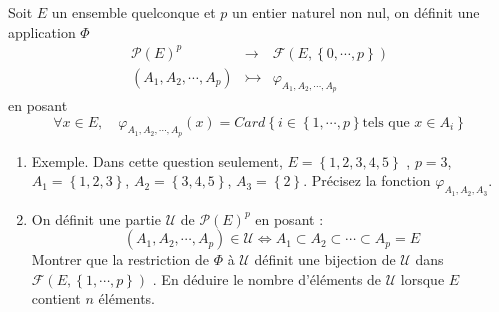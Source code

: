 Soit $E$ un ensemble quelconque et $p$ un entier naturel non nul,
on
d{\'e}finit une application $\Phi $%
\begin{eqnarray*}
\mathcal{P}(E)^{p} &\longrightarrow &\mathcal{F}(E,\left\{
0,\cdots
,p\right\} ) \\
(A_{1},A_{2},\cdots ,A_{p}) &\rightarrowtail &\varphi
_{A_{1},A_{2},\cdots ,A_{p}}
\end{eqnarray*}
en posant
\[
\forall x\in E,\quad \varphi _{A_{1},A_{2},\cdots
,A_{p}}(x)=Card\left\{ i\in \left\{ 1,\cdots ,p\right\} \text{
tels que }x\in A_{i}\right\}
\]

\begin{enumerate}
\item  Exemple. Dans cette question seulement, $E=\left\{ 1,2,3,4,5\right\} $%
, $p=3$, $A_{1}=\left\{ 1,2,3\right\} $, $A_{2}=\left\{ 3,4,5\right\} $, $%
A_{3}=\left\{ 2\right\} $. Pr{\'e}cisez la fonction $\varphi
_{A_{1},A_{2},A_{3}}$.

\item  On d{\'e}finit une partie $\mathcal{U}$ de $\mathcal{P}(E)^{p}$ en
posant :
\[
(A_{1},A_{2},\cdots ,A_{p})\in \mathcal{U}\Longleftrightarrow
A_{1}\subset A_{2}\subset \cdots \subset A_{p}=E
\]
Montrer que la restriction de $\Phi $ {\`a} $\mathcal{U}$ d{\'e}finit une
bijection de $\mathcal{U}$ dans $\mathcal{F}(E,\left\{ 1,\cdots ,p\right\} )$%
. En d{\'e}duire le nombre d'{\'e}l{\'e}ments de $\mathcal{U}$ lorsque $E$
contient $n$ {\'e}l{\'e}ments.
\end{enumerate}
